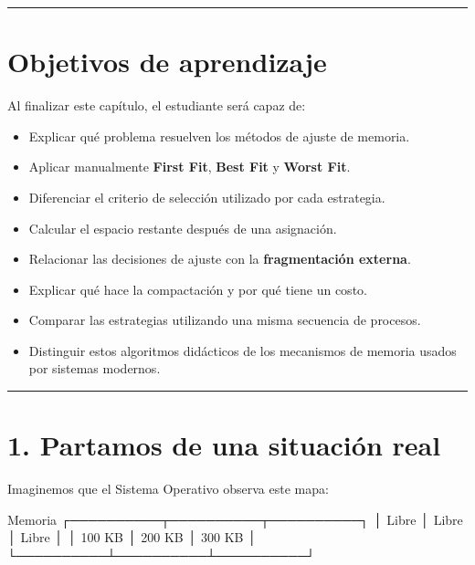 \documentclass[
  spanish,
  letterpaper,
]{scrbook}
\newenvironment{Shaded}{\begin{snugshade}}{\end{snugshade}}
\newcommand{\NormalTok}[1]{\textcolor[rgb]{0.00,0.23,0.31}{#1}}
\providecommand{\tightlist}{%
  \setlength{\itemsep}{0pt}\setlength{\parskip}{0pt}}
\begin{document}
\begin{center}\rule{0.5\linewidth}{0.5pt}\end{center}


\chapter{Objetivos de aprendizaje}\label{objetivos-de-aprendizaje-12}

Al finalizar este capítulo, el estudiante será capaz de:

\begin{itemize}
\tightlist
\item
  Explicar qué problema resuelven los métodos de ajuste de memoria.
\item
  Aplicar manualmente \textbf{First Fit}, \textbf{Best Fit} y
  \textbf{Worst Fit}.
\item
  Diferenciar el criterio de selección utilizado por cada estrategia.
\item
  Calcular el espacio restante después de una asignación.
\item
  Relacionar las decisiones de ajuste con la \textbf{fragmentación
  externa}.
\item
  Explicar qué hace la compactación y por qué tiene un costo.
\item
  Comparar las estrategias utilizando una misma secuencia de procesos.
\item
  Distinguir estos algoritmos didácticos de los mecanismos de memoria
  usados por sistemas modernos.
\end{itemize}

\begin{center}\rule{0.5\linewidth}{0.5pt}\end{center}


\chapter{1. Partamos de una situación
real}\label{partamos-de-una-situaciuxf3n-real-1}

Imaginemos que el Sistema Operativo observa este mapa:

\begin{Shaded}
\begin{Highlighting}[]
\NormalTok{Memoria}
\NormalTok{┌──────────┬──────────┬──────────┐}
\NormalTok{│ Libre    │ Libre    │ Libre    │}
\NormalTok{│ 100 KB   │ 200 KB   │ 300 KB   │}
\NormalTok{└──────────┴──────────┴──────────┘}
\end{Highlighting}
\end{Shaded}
\end{document}
